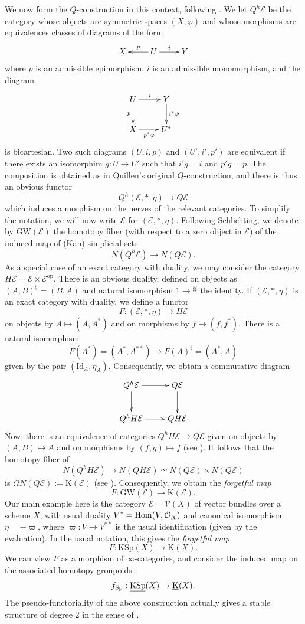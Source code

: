 \begin{num}
We now form the $Q$-construction in this context, following \cite[\S 4.1]{Schlichting09}. We let $Q^h\mathcal E$ be the category whose objects are symmetric spaces $(X,\varphi)$ and whose morphisms are equivalences classes of diagrams of the form
\[
\xymatrix{X & U\ar[l]_-p\ar[r]^-i & Y}
\] 
where $p$ is an admissible epimorphism, $i$ is an admissible monomorphism, and the diagram
\[
\xymatrix{U\ar[r]^-i\ar[d]_-p & Y\ar[d]^-{i^*\psi} \\
X\ar[r]_-{p^*\varphi} & U^*}
\]
is bicartesian. Two such diagrams $(U,i,p)$ and $(U',i',p')$ are equivalent if there exists an isomorphim $g:U\to U'$ such that $i'g=i$ and $p'g=p$. The composition is obtained as in Quillen's original $Q$-construction, and there is thus an obvious functor
\[
Q^h(\mathcal E,*,\eta)\to Q\mathcal E
\]
which induces a morphism on the nerves of the relevant categories. To simplify the notation, we will now write $\mathcal E$ for $(\mathcal E,*,\eta)$.
 Following Schlichting, we denote by $\mathrm{GW}(\mathcal E)$ the homotopy fiber (with respect to a zero object in $\mathcal E$) of the
 induced map of (Kan) simplicial sets:
\[
N(Q^h\mathcal E) \to N(Q\mathcal E).
\]
As a special case of an exact category with duality, we may consider the category $H\mathcal E=\mathcal E\times \mathcal E^{\mathrm{op}}$. There is an obvious duality, defined on objects as $(A,B)^{\sharp}=(B,A)$ and natural isomorphism $1\to {}^{\sharp\sharp}$ the identity. If $(\mathcal E,*,\eta)$ is an exact category with duality, we define a functor 
\[
F:(\mathcal E,*,\eta)\to H\mathcal E
\] 
on objects by $A\mapsto (A,A^*)$ and on morphisms by $f\mapsto (f,f^*)$. There is a natural isomorphism
\[
F(A^*)=(A^*,A^{**})\to F(A)^{\sharp}=(A^*,A)
\]
given by the pair $(\mathrm{Id}_A,\eta_A)$. Consequently, we obtain a commutative diagram
\[
\xymatrix{Q^h\mathcal E\ar[r]\ar[d] &  Q\mathcal E\ar[d]\\
Q^hH\mathcal E\ar[r] &  QH\mathcal E
}
\] 
Now, there is an equivalence of categories $Q^hH\mathcal E\to Q\mathcal E$ given on objects by $(A,B)\mapsto A$ and on morphisms by $(f,g)\mapsto f$ (see \cite[Remark 4.3]{Schlichting09}).
 It follows that the homotopy fiber of 
\[
N(Q^hH\mathcal E) \to N(QH\mathcal E) \simeq N(Q\mathcal E) \times N(Q\mathcal E)
\]
is $\Omega N(Q\mathcal E):=\mathrm{K}(\mathcal E)$ (see \cite[Proposition 4.7]{Schlichting09}).
 Consequently, we obtain the \emph{forgetful map}
\[
F:\mathrm{GW}(\mathcal E)\to \mathrm{K}(\mathcal E).
\]
Our main example here is the category $\mathcal E=\mathcal{V}(X)$ of vector bundles over a scheme $X$, with usual duality $V^*=\mathrm{Hom}(V,\mathcal O_X)$ and canonical isomorphism $\eta=-\varpi$, where $\varpi:V\to V^{**}$ is the usual identification (given by the evaluation). In the usual notation, this gives the \emph{forgetful map}
\[
F:\mathrm{KSp}(X)\to  \mathrm{K}(X).
\]
We can view $F$ as a morphism of $\infty$-categories, and consider the induced map on the associated homotopy groupoids:
$$
f_{\mathrm{Sp}}:\operatorname{\underline{KSp}}(X) \rightarrow \operatorname{\underline K}(X).
$$
The pseudo-functoriality of the above construction actually gives
 a stable structure of degree $2$ in the sense of .
\end{num}
